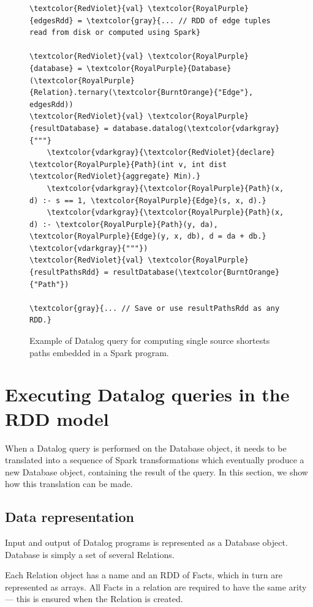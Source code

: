\begin{figure}[!htbp]
  \centering
\begin{Verbatim}
\textcolor{RedViolet}{val} \textcolor{RoyalPurple}{edgesRdd} = \textcolor{gray}{... // RDD of edge tuples read from disk or computed using Spark}

\textcolor{RedViolet}{val} \textcolor{RoyalPurple}{database} = \textcolor{RoyalPurple}{Database}(\textcolor{RoyalPurple}{Relation}.ternary(\textcolor{BurntOrange}{"Edge"}, edgesRdd))
\textcolor{RedViolet}{val} \textcolor{RoyalPurple}{resultDatabase} = database.datalog(\textcolor{vdarkgray}{"""}
    \textcolor{vdarkgray}{\textcolor{RedViolet}{declare} \textcolor{RoyalPurple}{Path}(int v, int dist \textcolor{RedViolet}{aggregate} Min).}
    \textcolor{vdarkgray}{\textcolor{RoyalPurple}{Path}(x, d) :- s == 1, \textcolor{RoyalPurple}{Edge}(s, x, d).}
    \textcolor{vdarkgray}{\textcolor{RoyalPurple}{Path}(x, d) :- \textcolor{RoyalPurple}{Path}(y, da), \textcolor{RoyalPurple}{Edge}(y, x, db), d = da + db.}
\textcolor{vdarkgray}{"""})
\textcolor{RedViolet}{val} \textcolor{RoyalPurple}{resultPathsRdd} = resultDatabase(\textcolor{BurntOrange}{"Path"})

\textcolor{gray}{... // Save or use resultPathsRdd as any RDD.}
\end{Verbatim}
  \caption{Example of Datalog query for computing single source shortests paths embedded in a Spark program.\label{sdinspark}}
\end{figure}
\section{Executing Datalog queries in the RDD model}

When a Datalog query is performed on the Database object, it needs to be translated into a sequence of Spark transformations which eventually produce a new Database object, containing the result of the query. In this section, we show how this translation can be made.

\subsection{Data representation}

Input and output of Datalog programs is represented as a Database object. Database is simply a set of several Relations.

Each Relation object has a name and an RDD of Facts, which in turn are represented as arrays. All Facts in a relation are required to have the same arity --- this is ensured when the Relation is created.

